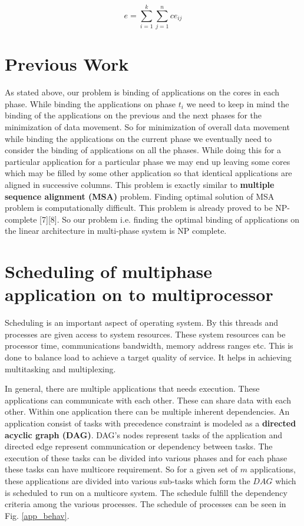 \documentclass[10pt, conference]{IEEEtran}
\begin{document}
\begin{equation} 
e = \sum_{i=1}^{k}\sum_{j=1}^{n}ce_{ij}
\label{totalentropy}
\end{equation}

\section{Previous Work}

As stated above, our problem is binding of applications on the cores in each phase. While binding the applications on phase $t_i$ we need to keep in mind the binding of the applications on the previous and the next phases for the minimization of data movement. So for minimization of overall data movement while binding the applications on the current phase we eventually need to consider the binding of applications on all the phases. While doing this for a particular application for a particular phase we may end up leaving some cores which may be filled by some other application so that identical applications are aligned in successive columns. This problem is exactly similar to {\bf multiple sequence alignment (MSA)} problem. Finding optimal solution of MSA problem is computationally difficult. This problem is already proved to be NP-complete \cite{Wang94}[7][8]. So our problem i.e. finding the optimal binding of applications on the linear architecture in multi-phase system is NP complete.
\section{Scheduling of multiphase application on to multiprocessor}
Scheduling is an important aspect of operating system. By this threads and processes are given access to system resources. These system resources can be processor time, communications bandwidth, memory address ranges etc. This is done to balance load to achieve a target quality of service. It helps in achieving multitasking and multiplexing. 

In general, there are multiple applications that needs execution. These applications can communicate with each other. These can share data with each other. Within one application there can be multiple inherent dependencies. An application consist of tasks with precedence constraint is modeled as a {\bf directed acyclic graph (DAG)}. DAG's nodes represent tasks of the application and directed edge represent communication or dependency between tasks. The execution of these tasks can be divided into various phases and for each phase these tasks can have multicore requirement. So for a given set of $m$ applications, these applications are divided into various sub-tasks which form the $DAG$ which is scheduled to run on a multicore system. The schedule fulfill the dependency criteria among the various processes. The schedule of processes can be seen in Fig. \ref{app_behav}. 
\end{document}
